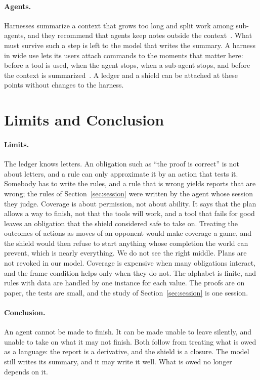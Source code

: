 \documentclass[acmsmall,nonacm,screen]{acmart}
\begin{document}
\paragraph{Agents.} Harnesses summarize a context that grows too long and split work among
sub-agents, and they recommend that agents keep notes outside the
context~\cite{anthropic2025context,packer2023}. What must survive such a step is left to
the model that writes the summary. A harness in wide use lets its users attach commands to
the moments that matter here: before a tool is used, when the agent stops, when a sub-agent
stops, and before the context is summarized~\cite{claudecodehooks}. A ledger and a shield
can be attached at these points without changes to the harness.

\section{Limits and Conclusion}
\label{sec:limits}

\paragraph{Limits.} The ledger knows letters. An obligation such as ``the proof is
correct'' is not about letters, and a rule can only approximate it by an action that tests
it. Somebody has to write the rules, and a rule that is wrong yields reports that are
wrong; the rules of Section~\ref{sec:session} were written by the agent whose session they
judge. Coverage is about permission, not about ability. It says that the plan allows a way
to finish, not that the tools will work, and a tool that fails for good leaves an
obligation that the shield considered safe to take on. Treating the outcomes of actions as
moves of an opponent would make coverage a game, and the shield would then refuse to start
anything whose completion the world can prevent, which is nearly everything. We do not see
the right middle. Plans are not revoked in our model. Coverage is expensive when many
obligations interact, and the frame condition helps only when they do not. The alphabet is
finite, and rules with data are handled by one instance for each value. The proofs are on
paper, the tests are small, and the study of Section~\ref{sec:session} is one session.

\paragraph{Conclusion.} An agent cannot be made to finish. It can be made unable to leave
silently, and unable to take on what it may not finish. Both follow from treating what is
owed as a language: the report is a derivative, and the shield is a closure. The model
still writes its summary, and it may write it well. What is owed no longer depends on it.



\end{document}
